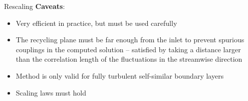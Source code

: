 \begin{frame}{Rescaling}
\textbf{Caveats}:
	\begin{itemize}
	\item Very efficient in practice, but must be used carefully
	\item The recycling plane must be far enough from the inlet to prevent spurious couplings in the computed solution -- satisfied by taking a distance larger than the correlation length of the fluctuations in the streamwise direction
	\item Method is only valid for fully turbulent self-similar boundary layers
	\item Scaling laws must hold
	\end{itemize}
\end{frame}
